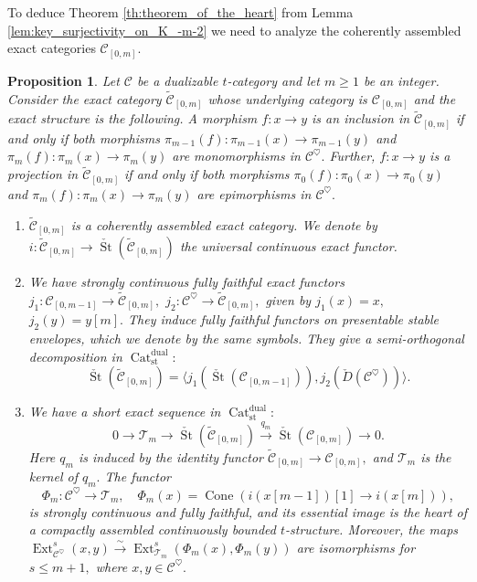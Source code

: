 \documentclass[11pt,leqno]{amsart}
\newtheorem{prop}[theo]{Proposition}
\numberwithin{equation}{section}
\def\wt{\widetilde}
\newcommand{\xto}{\xrightarrow}
\newcommand{\Cat}{\operatorname{Cat}}
\newcommand{\Cone}{\operatorname{Cone}}
\newcommand{\St}{\operatorname{St}}
\newcommand{\st}{\operatorname{st}}
\newcommand{\dual}{\operatorname{dual}}
\newcommand{\cC}{{\mathcal C}}
\newcommand{\cT}{{\mathcal T}}
\newcommand{\la}{\langle}
\newcommand{\ra}{\rangle}
\newcommand{\Ext}{\operatorname{Ext}}
\begin{document}
To deduce Theorem \ref{th:theorem_of_the_heart} from Lemma \ref{lem:key_surjectivity_on_K_-m-2} we need to analyze the coherently assembled exact categories $\cC_{[0,m]}.$ 

\begin{prop}\label{prop:properties_of_tilde_C}
Let $\cC$ be a dualizable $t$-category and let $m\geq 1$ be an integer. Consider the exact category $\wt{\cC}_{[0,m]}$ whose underlying category is $\cC_{[0,m]}$ and the exact structure is the following. A morphism $f:x\to y$ is an inclusion in $\wt{\cC}_{[0,m]}$ if and only if both morphisms $\pi_{m-1}(f):\pi_{m-1}(x)\to \pi_{m-1}(y)$ and $\pi_m(f):\pi_m(x)\to \pi_m(y)$ are monomorphisms in $\cC^{\heartsuit}.$ Further, $f:x\to y$ is a projection in $\wt{\cC}_{[0,m]}$ if and only if both morphisms $\pi_0(f):\pi_0(x)\to\pi_0(y)$ and $\pi_m(f):\pi_m(x)\to \pi_m(y)$ are epimorphisms in $\cC^{\heartsuit}.$
\begin{enumerate}[label=(\roman*),ref=(\roman*)]
\item $\wt{\cC}_{[0,m]}$ is a coherently assembled exact category. We denote by $i:\wt{\cC}_{[0,m]}\to \check{\St}(\wt{\cC}_{[0,m]})$ the universal continuous exact functor. \label{tilde_C_is_well_defined}
\item We have strongly continuous fully faithful exact functors $j_1:\cC_{[0,m-1]}\to\wt{\cC}_{[0,m]},$ $j_2:\cC^{\heartsuit}\to\wt{\cC}_{[0,m]},$ given by $j_1(x)=x,$ $j_2(y)=y[m].$ They induce fully faithful functors on presentable stable envelopes, which we denote by the same symbols. They give a semi-orthogonal decomposition in $\Cat_{\st}^{\dual}:$
\begin{equation}\label{eq:SOD_for_tilde_C}
\check{\St}(\wt{\cC}_{[0,m]})=\la j_1(\check{\St}(\cC_{[0,m-1]})),j_2(\check{D}(\cC^{\heartsuit}))\ra.	
\end{equation} \label{SOD_for_tilde_C}
\item We have a short exact sequence in $\Cat_{\st}^{\dual}:$
\begin{equation*}
0\to \cT_m\to \check{\St}(\wt{\cC}_{[0,m]})\xto{q_m}\check{\St}(\cC_{[0,m]})\to 0.
\end{equation*}
Here $q_m$ is induced by the identity functor $\wt{\cC}_{[0,m]}\to\cC_{[0,m]},$ and $\cT_m$ is the kernel of $q_m.$ The functor
\begin{equation*}
\Phi_m:\cC^{\heartsuit}\to \cT_m,\quad \Phi_m(x)=\Cone(i(x[m-1])[1]\to i(x[m])),
\end{equation*}
is strongly continuous and fully faithful, and its essential image is the heart of a compactly assembled continuously bounded $t$-structure. Moreover, the maps $\Ext^s_{\cC^{\heartsuit}}(x,y)\xto{\sim}\Ext^s_{\cT_m}(\Phi_m(x),\Phi_m(y))$ are isomorphisms for $s\leq m+1,$ where $x,y\in\cC^{\heartsuit}.$ \label{short_exact_sequence_for_tilde_C}
\end{enumerate} 
\end{prop}
\end{document}
